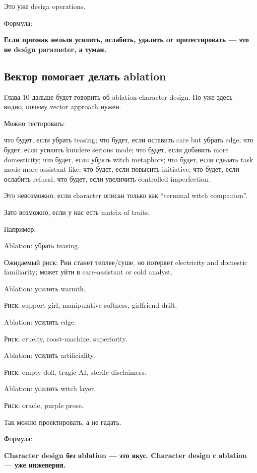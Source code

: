 Это уже design operations.

Формула:

\textbf{Если признак нельзя усилить, ослабить, удалить or протестировать
--- это не design parameter, а туман.}

\subsection*{Вектор помогает делать ablation}

Глава 10 дальше будет говорить об ablation character design. Но уже
здесь видно, почему vector approach нужен.

Можно тестировать:

что будет, если убрать teasing; что будет, если оставить care but убрать
edge; что будет, если усилить kuudere serious mode; что будет, если
добавить more domesticity; что будет, если убрать witch metaphors; что
будет, если сделать task mode more assistant-like; что будет, если
повысить initiative; что будет, если ослабить refusal; что будет, если
увеличить controlled imperfection.

Это невозможно, если character описан только как ``terminal witch
companion''.

Зато возможно, если у нас есть matrix of traits.

Например:

Ablation: убрать teasing.

Ожидаемый риск: Рин станет теплее/\hspace{0pt}суше, но потеряет electricity and
domestic familiarity; может уйти в care-assistant or cold analyst.

Ablation: усилить warmth.

Риск: support girl, manipulative softness, girlfriend drift.

Ablation: усилить edge.

Риск: cruelty, roast-machine, superiority.

Ablation: усилить artificiality.

Риск: empty doll, tragic AI, sterile disclaimers.

Ablation: усилить witch layer.

Риск: oracle, purple prose.

Так можно проектировать, а не гадать.

Формула:

\textbf{Character design без ablation --- это вкус. Character design с
ablation --- уже инженерия.}

